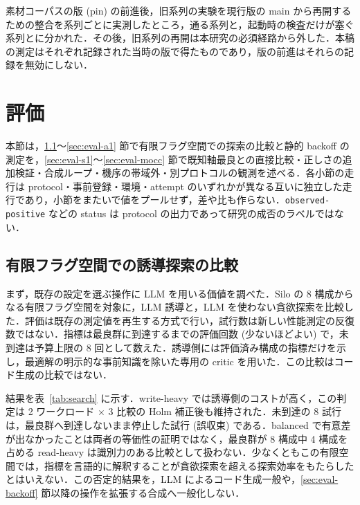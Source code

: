 \documentclass[submit,techrep,noauthor]{ipsj}
\begin{document}
素材コーパスの版 (pin) の前進後，旧系列の実験を現行版の main から再開するための整合を系列ごとに実測したところ，通る系列と，起動時の検査だけが塞ぐ系列とに分かれた．その後，旧系列の再開は本研究の必須経路から外した．本稿の測定はそれぞれ記録された当時の版で得たものであり，版の前進はそれらの記録を無効にしない．

\section{評価}\label{sec:eval}

本節は，\ref{sec:eval-search}〜\ref{sec:eval-a1} 節で有限フラグ空間での探索の比較と静的 backoff の測定を，\ref{sec:eval-s1}〜\ref{sec:eval-mocc} 節で既知軸最良との直接比較・正しさの追加検証・合成ループ・機序の帯域外・別プロトコルの観測を述べる．各小節の走行は protocol・事前登録・環境・attempt のいずれかが異なる互いに独立した走行であり，小節をまたいで値をプールせず，差や比も作らない．\texttt{observed-positive} などの status は protocol の出力であって研究の成否のラベルではない．

\subsection{有限フラグ空間での誘導探索の比較}\label{sec:eval-search}

まず，既存の設定を選ぶ操作に LLM を用いる価値を調べた．Silo の 8 構成からなる有限フラグ空間を対象に，LLM 誘導と，LLM を使わない貪欲探索を比較した．評価は既存の測定値を再生する方式で行い，試行数は新しい性能測定の反復数ではない．指標は最良群に到達するまでの評価回数 (少ないほどよい) で，未到達は予算上限の 8 回として数えた．誘導側には評価済み構成の指標だけを示し，最適解の明示的な事前知識を除いた専用の critic を用いた．この比較はコード生成の比較ではない．

結果を表~\ref{tab:search} に示す．write-heavy では誘導側のコストが高く，この判定は 2 ワークロード $\times$ 3 比較の Holm 補正後も維持された．未到達の 8 試行は，最良群へ到達しないまま停止した試行 (誤収束) である．balanced で有意差が出なかったことは両者の等価性の証明ではなく，最良群が 8 構成中 4 構成を占める read-heavy は識別力のある比較として扱わない．少なくともこの有限空間では，指標を言語的に解釈することが貪欲探索を超える探索効率をもたらしたとはいえない．この否定的結果を，LLM によるコード生成一般や，\ref{sec:eval-backoff} 節以降の操作を拡張する合成へ一般化しない．
\end{document}
